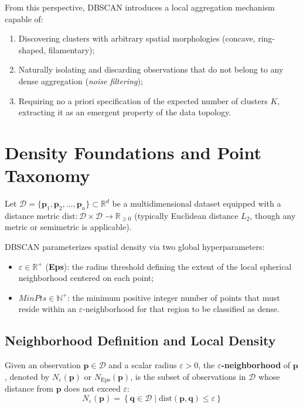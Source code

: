 From this perspective, DBSCAN introduces a local aggregation mechanism capable of:
\begin{enumerate}
    \item Discovering clusters with arbitrary spatial morphologies (concave, ring-shaped, filamentary);
    \item Naturally isolating and discarding observations that do not belong to any dense aggregation (\textit{noise filtering});
    \item Requiring no a priori specification of the expected number of clusters $K$, extracting it as an emergent property of the data topology.
\end{enumerate}

\section{Density Foundations and Point Taxonomy}
\label{sec:dm-dbscan-density-taxonomy}

Let $\mathcal{D} = \{\mathbf{p}_1, \mathbf{p}_2, \dots, \mathbf{p}_n\} \subset \mathbb{R}^d$ be a multidimensional dataset equipped with a distance metric $\mathrm{dist}: \mathcal{D} \times \mathcal{D} \to \mathbb{R}_{\ge 0}$ (typically Euclidean distance $L_2$, though any metric or semimetric is applicable).

DBSCAN parameterizes spatial density via two global hyperparameters:
\begin{itemize}
    \item $\varepsilon \in \mathbb{R}^+$ (\textbf{Eps}): the radius threshold defining the extent of the local spherical neighborhood centered on each point;
    \item $MinPts \in \mathbb{N}^+$: the minimum positive integer number of points that must reside within an $\varepsilon$-neighborhood for that region to be classified as dense.
\end{itemize}

\subsection{Neighborhood Definition and Local Density}

\begin{definition}
Given an observation $\mathbf{p} \in \mathcal{D}$ and a scalar radius $\varepsilon > 0$, the \textbf{$\varepsilon$-neighborhood} of $\mathbf{p}$, denoted by $N_\varepsilon(\mathbf{p})$ or $N_{\mathrm{Eps}}(\mathbf{p})$, is the subset of observations in $\mathcal{D}$ whose distance from $\mathbf{p}$ does not exceed $\varepsilon$:
\begin{equation}
    N_\varepsilon(\mathbf{p}) = \left\{ \mathbf{q} \in \mathcal{D} \;\big|\; \mathrm{dist}(\mathbf{p}, \mathbf{q}) \le \varepsilon \right\}
    \label{eq:dm-eps-neighborhood}
\end{equation}
\end{definition}

